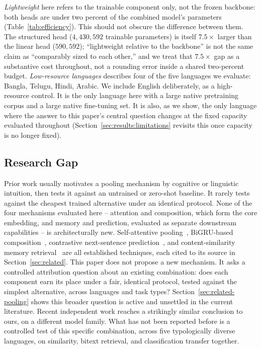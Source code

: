 \documentclass[manuscript]{acmart}
\begin{document}
\emph{Lightweight} here refers to the trainable component only, not the frozen backbone: both heads are under two percent of the combined model's parameters (Table~\ref{tab:efficiency}). This should not obscure the difference between them. The structured head ($4{,}430{,}592$ trainable parameters) is itself $7.5\times$ larger than the linear head ($590{,}592$); ``lightweight relative to the backbone'' is not the same claim as ``comparably sized to each other,'' and we treat that $7.5\times$ gap as a substantive cost throughout, not a rounding error inside a shared two-percent budget. \emph{Low-resource languages} describes four of the five languages we evaluate: Bangla, Telugu, Hindi, Arabic. We include English deliberately, as a high-resource control. It is the only language here with a large native pretraining corpus and a large native fine-tuning set. It is also, as we show, the only language where the answer to this paper's central question changes at the fixed capacity evaluated throughout (Section~\ref{sec:results:limitations} revisits this once capacity is no longer fixed).

\subsection{Research Gap}
\label{sec:gap}

Prior work usually motivates a pooling mechanism by cognitive or linguistic intuition, then tests it against an untrained or zero-shot baseline. It rarely tests against the cheapest trained alternative under an identical protocol. None of the four mechanisms evaluated here -- attention and composition, which form the core embedding, and memory and prediction, evaluated as separate downstream capabilities -- is architecturally new. Self-attentive pooling~\citep{lin2017structured}, BiGRU-based composition~\citep{conneau2017infersent}, contrastive next-sentence prediction~\citep{logeswaran2018quickthoughts}, and content-similarity memory retrieval~\citep{sukhbaatar2015memnn} are all established techniques, each cited to its source in Section~\ref{sec:related}. This paper does not propose a new mechanism. It asks a controlled attribution question about an existing combination: does each component earn its place under a fair, identical protocol, tested against the simplest alternative, across languages and task types? Section~\ref{sec:related-pooling} shows this broader question is active and unsettled in the current literature. Recent independent work reaches a strikingly similar conclusion to ours, on a different model family. What has not been reported before is a controlled test of this specific combination, across five typologically diverse languages, on similarity, bitext retrieval, and classification transfer together.
\end{document}
